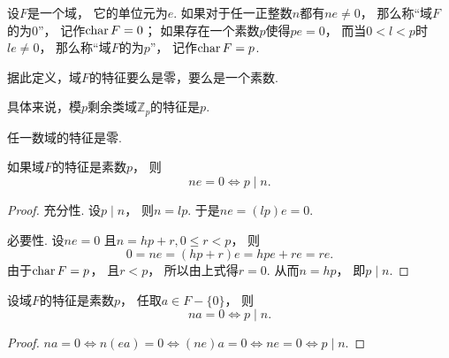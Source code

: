 \begin{definition}\label{definition:域的特征.域的特征}
设\(F\)是一个域，
它的单位元为\(e\).
如果对于任一正整数\(n\)都有\(ne\neq0\)，
那么称“域\(F\)的为0”，
记作\(\operatorname{char} F=0\)；
如果存在一个素数\(p\)使得\(pe=0\)，
而当\(0<l<p\)时\(le\neq0\)，
那么称“域\(F\)的为\(p\)”，
记作\(\operatorname{char} F=p\).
\end{definition}

据此定义，域\(F\)的特征要么是零，要么是一个素数.

具体来说，模\(p\)剩余类域\(\mathbb{Z}_p\)的特征是\(p\).

任一数域的特征是零.

\begin{corollary}\label{theorem:域的特征.特征为p的域的性质1}
如果域\(F\)的特征是素数\(p\)，
则\begin{equation*}
	ne=0
	\iff
	p \mid n.
\end{equation*}
\begin{proof}
充分性.
设\(p \mid n\)，
则\(n=lp\).
于是\(ne
=(lp)e
=0\).

必要性.
设\(ne=0\)
且\(n=hp+r,0\leq r<p\)，
则\begin{equation*}
	0=ne
	=(hp+r)e
	=hpe+re
	=re.
\end{equation*}
由于\(\operatorname{char} F=p\)，
且\(r<p\)，
所以由上式得\(r=0\).
从而\(n=hp\)，
即\(p \mid n\).
\end{proof}
\end{corollary}

\begin{corollary}\label{theorem:域的特征.特征为p的域的性质2}
设域\(F\)的特征是素数\(p\)，
任取\(a \in F-\{0\}\)，
则\begin{equation*}
	na=0
	\iff
	p \mid n.
\end{equation*}
\begin{proof}
\(na=0
\iff
n(ea)=0
\iff
(ne)a=0
\iff
ne=0
\iff
p \mid n\).
\end{proof}
\end{corollary}

